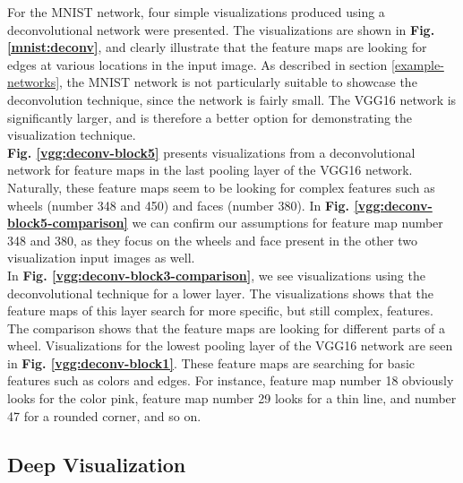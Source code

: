 For the MNIST network, four simple visualizations produced using a deconvolutional network were presented. The visualizations are shown in \textbf{Fig. \ref{mnist:deconv}}, and clearly illustrate that the feature maps are looking for edges at various locations in the input image. As described in section \ref{example-networks}, the MNIST network is not particularly suitable to showcase the deconvolution technique, since the network is fairly small. The VGG16 network is significantly larger, and is therefore a better option for demonstrating the visualization technique. \\

\noindent \textbf{Fig. \ref{vgg:deconv-block5}} presents visualizations from a deconvolutional network for feature maps in the last pooling layer of the VGG16 network. Naturally, these feature maps seem to be looking for complex features such as wheels (number 348 and 450) and faces (number 380). In \textbf{Fig. \ref{vgg:deconv-block5-comparison}} we can confirm our assumptions for feature map number 348 and 380, as they focus on the wheels and face present in the other two visualization input images as well. \\

\noindent In \textbf{Fig. \ref{vgg:deconv-block3-comparison}}, we see visualizations using the deconvolutional technique for a lower layer. The visualizations shows that the feature maps of this layer search for more specific, but still complex, features. The comparison shows that the feature maps are looking for different parts of a wheel. Visualizations for the lowest pooling layer of the VGG16 network are seen in \textbf{Fig. \ref{vgg:deconv-block1}}. These feature maps are searching for basic features such as colors and edges. For instance, feature map number 18 obviously looks for the color pink, feature map number 29 looks for a thin line, and number 47 for a rounded corner, and so on. 

\subsection{Deep Visualization}

